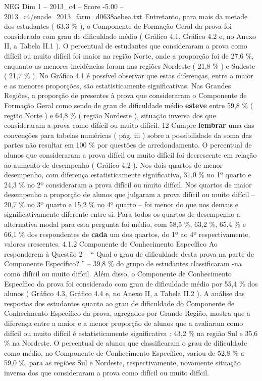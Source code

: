\begin{textsample}{NEG Dim 1 – 2013\_c4 – Score -5.00 – 2013\_c4/enade\_2013\_farm\_d0638aebea.txt}
Entretanto, para mais da metade dos estudantes ( 63,3 \% ), o Componente de Formação Geral da prova foi considerado com grau de dificuldade médio ( Gráfico 4.1, Gráfico 4.2 e, no Anexo II, a Tabela II.1 ).
O percentual de estudantes que consideraram a prova como difícil ou muito difícil foi maior na região Norte, onde a proporção foi de 27,6 \%, enquanto as menores incidências foram nas regiões Nordeste ( 21,8 \% ) e Sudeste ( 21,7 \% ).
No Gráfico 4.1 é possível observar que estas diferenças, entre a maior e as menores proporções, são estatisticamente significativas.
Nas Grandes Regiões, a proporção de presentes à prova que consideraram o Componente de Formação Geral como sendo de grau de dificuldade médio \textbf{esteve} entre 59,8 \% ( região Norte ) e 64,8 \% ( região Nordeste ), situação inversa dos que consideraram a prova como difícil ou muito difícil. 12 Cumpre \textbf{lembrar} uma das convenções para tabelas numéricas ( pág. iii ) sobre a possibilidade da soma das partes não resultar em 100 \% por questões de arredondamento.
O percentual de alunos que consideraram a prova difícil ou muito difícil foi decrescente em relação ao aumento de desempenho ( Gráfico 4.2 ).
Nos dois quartos de menor desempenho, com diferença estatisticamente significativa, 31,0 \% no 1º quarto e 24,3 \% no 2º consideraram a prova difícil ou muito difícil.
Nos quartos de maior desempenho a proporção de alunos que julgaram a prova difícil ou muito difícil – 20,7 \% no 3º quarto e 15,2 \% no 4º quarto – foi menor do que nos demais e significativamente diferente entre si.
Para todos os quartos de desempenho a alternativa modal para esta pergunta foi médio, com 58,5 \%, 63,2 \%, 65,4 \% e 66,1 \% dos respondentes de \textbf{cada} um dos quartos, do 1º ao 4º respectivamente, valores crescentes. 4.1.2 Componente de Conhecimento Específico Ao responderem à Questão 2 – “ Qual o grau de dificuldade desta prova na parte de Componente Específico? ” – 39,8 \% do grupo de estudantes classificaram -na como difícil ou muito difícil.
Além disso, o Componente de Conhecimento Específico da prova foi considerado com grau de dificuldade médio por 55,4 \% dos alunos ( Gráfico 4.3, Gráfico 4.4 e, no Anexo II, a Tabela II.2 ).
A análise das respostas dos estudantes quanto ao grau de dificuldade do Componente de Conhecimento Específico da prova, agregados por Grande Região, mostra que a diferença entre a maior e a menor proporção de alunos que a avaliaram como difícil ou muito difícil é estatisticamente significativa : 43,2 \% na região Sul e 35,6 \% na Nordeste.
O percentual de alunos que classificaram o grau de dificuldade como médio, no Componente de Conhecimento Específico, variou de 52,8 \% a 59,0 \%, para as regiões Sul e Nordeste, respectivamente, novamente situação inversa dos que consideraram a prova como difícil ou muito difícil.

\end{textsample}
